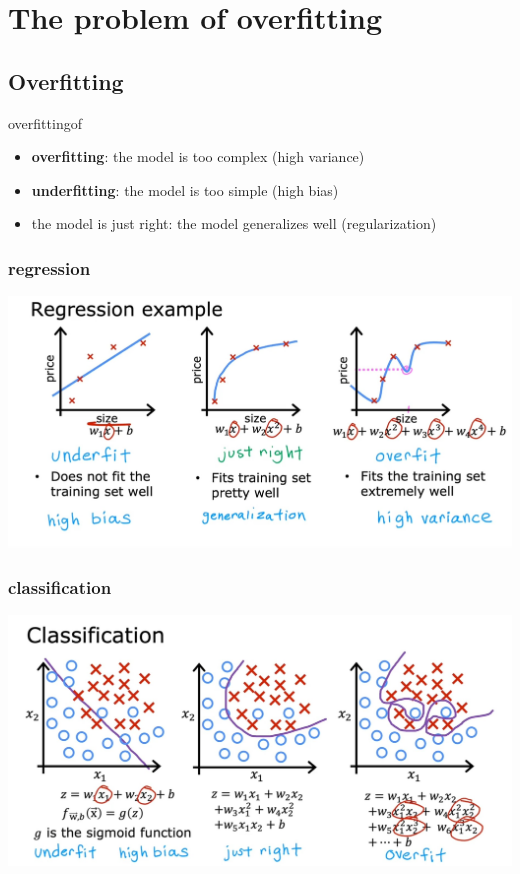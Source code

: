 \chapter{The problem of overfitting}
\section{Overfitting}
\begin{dfnbox}{overfitting}{of}
    \begin{itemize}
        \item \textbf{overfitting}: the model is too complex (high variance)
        \item \textbf{underfitting}: the model is too simple (high bias)
        \item the model is just right: the model generalizes well (regularization)
    \end{itemize}
\end{dfnbox}
\subsection*{regression}
\noindent
\includegraphics*[width=\textwidth]{images/7.1 (2).jpg}
\subsection*{classification}
\noindent
\includegraphics*[width=\textwidth]{images/7.1 (1).jpg}

